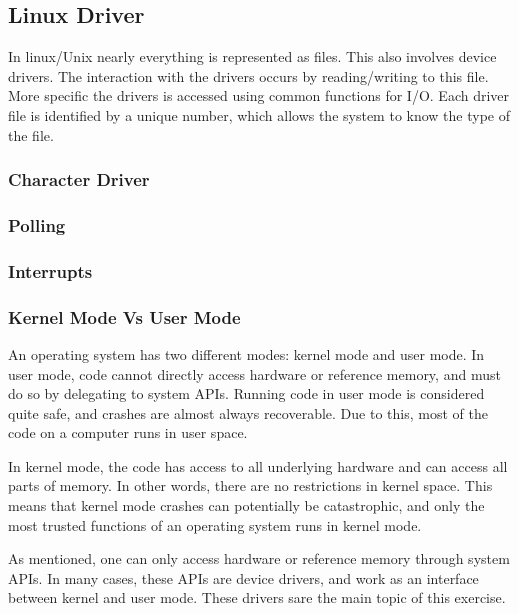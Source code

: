 \subsection{Linux Driver}
In linux/Unix nearly everything is represented as files. This also involves device drivers. The interaction with the drivers occurs by reading/writing to this file. More specific the drivers is accessed  using common functions for I/O. Each driver file is identified by a unique number, which allows the system to know the type of the file. 









\subsubsection{Character Driver}


\subsubsection{Polling}

\subsubsection{Interrupts}

\subsubsection{Kernel Mode Vs User Mode}
An operating system has two different modes: kernel mode and user mode. In user mode, code cannot directly access hardware or reference memory, and must do so by delegating to system APIs. Running code in user mode is considered quite safe, and crashes are almost always recoverable. Due to this, most of the code on a computer runs in user space. 

In kernel mode, the code has access to all underlying hardware and can access all parts of memory. In other words, there are no restrictions in kernel space. This means that kernel mode crashes can potentially be catastrophic, and only the most trusted functions of an operating system runs in kernel mode. 
	
As mentioned, one can only access hardware or reference memory through system APIs. In many cases, these APIs are device drivers, and work as an interface between kernel and user mode. These drivers sare the main topic of this exercise.
